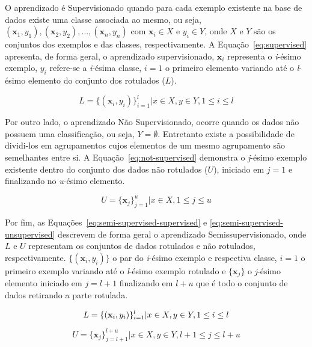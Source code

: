     O aprendizado é Supervisionado quando para cada exemplo existente na base de dados existe uma classe associada ao mesmo, ou seja, $(\mathbf{x}_1, y_1), (\mathbf{x}_2, y_2), \dots, (\mathbf{x}_n, y_n)$ com $\mathbf{x}_i \in X$ e $y_i \in Y$, onde $X$ e $Y$ são os conjuntos dos exemplos e das classes, respectivamente. A Equação~\ref{eq:supervised} apresenta, de forma geral, o aprendizado supervisionado, $\mathbf{x}_i$ representa o \textit{i}\hyp{ésimo} exemplo, $y_i$ refere\hyp{se} a \textit{i}\hyp{ésima} classe, $i = 1$ o primeiro elemento variando até o \textit{l}\hyp{ésimo} elemento do conjunto dos rotulados ($L$).
    
    \begin{equation}
        \label{eq:supervised}
        L = \{(\mathbf{x}_i, y_i)\}^{l}_{i=1} | x \in X, y \in Y, 1 \leq i \leq l
    \end{equation}
    
    Por outro lado, o aprendizado Não Supervisionado, ocorre quando os dados não possuem uma classificação, ou seja, $Y = \emptyset$. Entretanto existe a possibilidade de dividi\hyp{los} em agrupamentos cujos elementos de um mesmo agrupamento são semelhantes entre si. A Equação~\ref{eq:not-supervised} demonstra o \textit{j}\hyp{ésimo} exemplo existente dentro do conjunto dos dados não rotulados ($U$), iniciado em $j = 1$ e finalizando no \textit{u}\hyp{ésimo} elemento.
    
    \begin{equation}
        \label{eq:not-supervised}
        U = \{\mathbf{x}_j\}^{u}_{j=1} | x \in X, 1 \leq j \leq u
    \end{equation}
    
    
    Por fim, as Equações~\ref{eq:semi-supervised-supervised} e \ref{eq:semi-supervised-unsupervised} descrevem de forma geral o aprendizado Semissupervisionado, onde $L$ e $U$ representam os conjuntos de dados rotulados e não rotulados, respectivamente. $\{(\mathbf{x}_i, y_i)\}$ o par do \textit{i}\hyp{ésimo} exemplo e respectiva classe, $i = 1$ o primeiro exemplo variando até o \textit{l}\hyp{ésimo} exemplo rotulado e $\{\mathbf{x}_j\}$ o \textit{j}\hyp{ésimo} elemento iniciado em $j = l + 1$ finalizando em $l+u$ que é todo o conjunto de dados retirando a parte rotulada.
    
    \begin{equation}
        \label{eq:semi-supervised-supervised}
        L = \{(\mathbf{x}_i, y_i)\}^l_{i = 1} | x \in X, y \in Y, 1 \leq i \leq l \\
    \end{equation}
    
    \begin{equation}
        \label{eq:semi-supervised-unsupervised}
        U = \{\mathbf{x}_j\}^{l+u}_{j = l+1} | x \in X, y \in Y, l + 1 \leq j \leq l + u
    \end{equation}
    